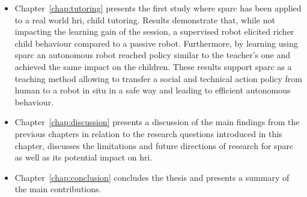 \begin{itemize}
	\item Chapter~\ref{chap:tutoring} presents the first study where \gls{sparc} has been applied to a real world \gls{hri}, child tutoring. Results demonstrate that, while not impacting the learning gain of the session, a supervised robot elicited richer child behaviour compared to a passive robot. Furthermore, by learning using \gls{sparc} an autonomous robot reached policy similar to the teacher's one and achieved the same impact on the children. These results support \gls{sparc} as a teaching method allowing to transfer a social and technical action policy from human to a robot in situ in a safe way and leading to efficient autonomous behaviour.
	
	\item Chapter~\ref{chap:discussion} presents a discussion of the main findings from the previous chapters in relation to the research questions introduced in this chapter, discusses the limitations and future directions of research for \gls{sparc} as well as its potential impact on \gls{hri}.
	\item Chapter~\ref{chap:conclusion} concludes the thesis and presents a summary of the main contributions.
	
\end{itemize}
